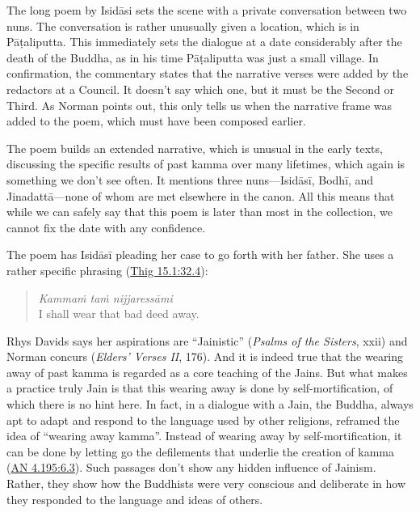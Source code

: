 \documentclass[12pt,openany]{book}%
\begin{document}
The long poem by \textsanskrit{Isidāsi} sets the scene with a private conversation between two nuns. The conversation is rather unusually given a location, which is in \textsanskrit{Pāṭaliputta}. This immediately sets the dialogue at a date considerably after the death of the Buddha, as in his time \textsanskrit{Pāṭaliputta} was just a small village. In confirmation, the commentary states that the narrative verses were added by the redactors at a Council. It doesn’t say which one, but it must be the Second or Third. As Norman points out, this only tells us when the narrative frame was added to the poem, which must have been composed earlier.

The poem builds an extended narrative, which is unusual in the early texts, discussing the specific results of past kamma over many lifetimes, which again is something we don’t see often. It mentions three nuns—\textsanskrit{Isidāsī}, \textsanskrit{Bodhī}, and \textsanskrit{Jinadattā}—none of whom are met elsewhere in the canon. All this means that while we can safely say that this poem is later than most in the collection, we cannot fix the date with any confidence.

The poem has \textsanskrit{Isidāsī} pleading her case to go forth with her father. She uses a rather specific phrasing (\href{https://suttacentral.net/thig15.1/en/sujato\#32.4}{Thig 15.1:32.4}):

\begin{verse}%
\textit{\textsanskrit{Kammaṁ} \textsanskrit{taṁ} \textsanskrit{nijjaressāmi}} \\
I shall wear that bad deed away.

%
\end{verse}

Rhys Davids says her aspirations are “Jainistic” (\textit{Psalms of the Sisters}, xxii) and Norman concurs (\textit{Elders’ Verses II}, 176). And it is indeed true that the wearing away of past kamma is regarded as a core teaching of the Jains. But what makes a practice truly Jain is that this wearing away is done by self-mortification, of which there is no hint here. In fact, in a dialogue with a Jain, the Buddha, always apt to adapt and respond to the language used by other religions, reframed the idea of “wearing away kamma”. Instead of wearing away by self-mortification, it can be done by letting go the defilements that underlie the creation of kamma (\href{https://suttacentral.net/an4.195/en/sujato\#6.3}{AN 4.195:6.3}). Such passages don’t show any hidden influence of Jainism. Rather, they show how the Buddhists were very conscious and deliberate in how they responded to the language and ideas of others.
\end{document}
